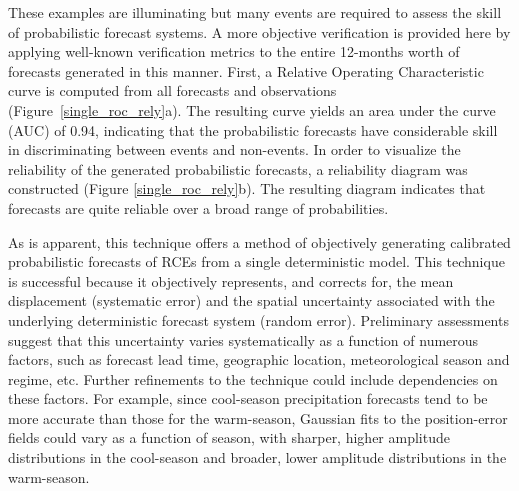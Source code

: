 These examples are illuminating but many events are required to assess the skill of probabilistic forecast systems. A more objective verification is provided here by applying well-known verification metrics to the entire 12-months worth of forecasts generated in this manner. First, a Relative Operating Characteristic curve \citep{Mason1982} is computed from all forecasts and observations \mbox{(Figure \ref{single_roc_rely}a)}. The resulting curve yields an area under the curve (AUC) of 0.94, indicating that the probabilistic forecasts have considerable skill in discriminating between events and non-events. In order to visualize the reliability of the generated probabilistic forecasts, a reliability diagram was constructed (Figure \mbox{\ref{single_roc_rely}b)}. The resulting diagram indicates that forecasts are quite reliable over a broad range of probabilities.

As is apparent, this technique offers a method of objectively generating calibrated probabilistic forecasts of RCEs from a single deterministic model. This technique is successful because it objectively represents, and corrects for, the mean displacement (systematic error) and the spatial uncertainty associated with the underlying deterministic forecast system (random error). Preliminary assessments suggest that this uncertainty varies systematically as a function of numerous factors, such as forecast lead time, geographic location, meteorological season and regime, etc. Further refinements to the technique could include dependencies on these factors. For example, since cool-season precipitation forecasts tend to be more accurate than those for the warm-season, Gaussian fits to the position-error fields could vary as a function of season, with sharper, higher amplitude distributions in the cool-season and broader, lower amplitude distributions in the warm-season.


